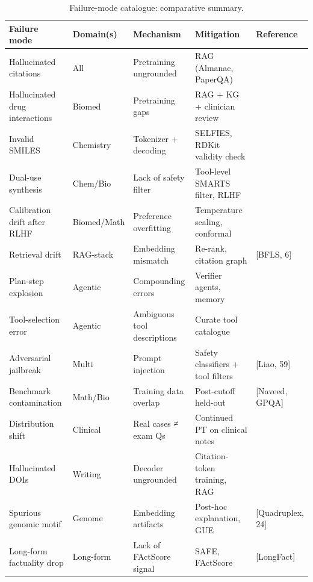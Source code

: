\documentclass{article}
\begin{document}
\begin{table}[t]
\centering
\caption{Failure-mode catalogue: comparative summary.}
\label{tab:failure-mode-catalogue}
\begin{tabular}{>{\raggedright\arraybackslash}p{0.2564\linewidth}
  >{\raggedright\arraybackslash}p{0.0940\linewidth}
  >{\raggedright\arraybackslash}p{0.2308\linewidth}
  >{\raggedright\arraybackslash}p{0.2821\linewidth}
  >{\raggedright\arraybackslash}p{0.1368\linewidth}}
\toprule
Failure mode & Domain(s) & Mechanism & Mitigation & Reference \\
\midrule
Hallucinated citations & All & Pretraining ungrounded & RAG (Almanac, PaperQA) & \cite{taylor2022arxiv2211090852022,ala2023arxiv2312075592023,zakka2024almanacretrievalau} \\
Hallucinated drug interactions & Biomed & Pretraining gaps & RAG + KG + clinician review & \cite{hager2024evaluationandmitig,zakka2024almanacretrievalau} \\
Invalid SMILES & Chemistry & Tokenizer + decoding & SELFIES, RDKit validity check & \cite{bran2024naturemachineintel,pei2023emnlp2023} \\
Dual-use synthesis & Chem/Bio & Lack of safety filter & Tool-level SMARTS filter, RLHF & \cite{boiko2023nature6242023,bran2024naturemachineintel,bengio2024internationalscien} \\
Calibration drift after RLHF & Biomed/Math & Preference overfitting & Temperature scaling, conformal & \cite{hager2024evaluationandmitig,singhal2025towardexpertlevelm} \\
Retrieval drift & RAG-stack & Embedding mismatch & Re-rank, citation graph & {[}BFLS, 6{]} \\
Plan-step explosion & Agentic & Compounding errors & Verifier agents, memory & \cite{schmidgall2025agentlaboratoryusi,boiko2023nature6242023} \\
Tool-selection error & Agentic & Ambiguous tool descriptions & Curate tool catalogue & \cite{yu2024chemtoolagenttheim} \\
Adversarial jailbreak & Multi & Prompt injection & Safety classifiers + tool filters & {[}Liao, 59{]} \\
Benchmark contamination & Math/Bio & Training data overlap & Post-cutoff held-out & {[}Naveed, GPQA{]} \\
Distribution shift & Clinical & Real cases ≠ exam Qs & Continued PT on clinical notes & \cite{hager2024evaluationandmitig,lee2025arxiv2504039642025} \\
Hallucinated DOIs & Writing & Decoder ungrounded & Citation-token training, RAG & \cite{taylor2022arxiv2211090852022,ala2023arxiv2312075592023} \\
Spurious genomic motif & Genome & Embedding artifacts & Post-hoc explanation, GUE & {[}Quadruplex, 24{]} \\
Long-form factuality drop & Long-form & Lack of FActScore signal & SAFE, FActScore & {[}LongFact{]} \\
\end{tabular}
\end{table}
\end{document}
